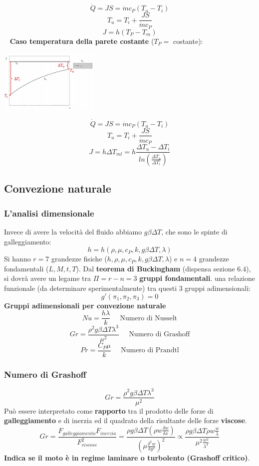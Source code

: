 \[
    \dot{Q} = JS = \dot{m} c_P (T_u- T_i)
\]
\[
    T_u = T_i + \frac{JS}{\dot{m} c_P}
\]
\[
    J = h (T_P - T_m)
\]
\ \newline
\textbf{Caso temperatura della parete costante} ($T_P =$ costante):
\begin{center}
    \includegraphics[height=3cm]{../L11/img4.PNG}
\end{center}
\[
    \dot{Q} = JS = \dot{m} c_P (T_u - T_i)
\]
\[
    T_u = T_i + \frac{JS}{\dot{m}c_P}
\]
\[
    J = h \Delta T_{ml} = h \frac{\Delta T_u - \Delta T_i}{ln \left(\frac{\Delta T_u}{\Delta T_i}\right)}
\]
\subsection{Convezione naturale}
\subsubsection{L'analisi dimensionale}
Invece di avere la velocità del fluido abbiamo $g \beta \Delta T$, che sono le spinte di galleggiamento:
\[
    h = h(\rho, \mu, c_P, k, g \beta \Delta T, \lambda)
\]
Si hanno $r = 7$ grandezze fisiche ($h, \rho, \mu, c_P, k, g \beta \Delta T, \lambda$) e $n = 4$ grandezze fondamentali ($L, M, t, T$).\newline
\newline
Dal \textbf{teorema di Buckingham} (dispensa sezione $6.4$), si dovrà avere un legame tra $\Pi = r-n = 3$ \textbf{gruppi fondamentali}.\newline
\newlineEsiste una relazione funzionale (da determinare sperimentalmente) tra questi $3$ gruppi adimensionali:
\[
    g'(\pi_1, \pi_2, \pi_3) = 0
\]
\textbf{Gruppi adimensionali per convezione naturale}
\[
    Nu = \frac{h \lambda}{k} \;\;\;\;\;\text{Numero di Nusselt}
\]
\[
    Gr = \frac{\rho^2 g \beta \Delta T \lambda^3}{\mu^2} \;\;\;\;\;\text{Numero di Grashoff}
\]
\[
    Pr = \frac{C_P \mu}{k} \;\;\;\;\; \text{Numero di Prandtl}
\]
\subsubsection{Numero di Grashoff}
\[
    Gr = \frac{\rho^2 g \beta \Delta T \lambda^3}{\mu^2}
\]
Può essere interpretato come \textbf{rapporto} tra il prodotto delle forze di \textbf{galleggiamento} e di inerzia ed il quadrato della risultante delle forze \textbf{viscose}.
\[
    Gr = \frac{F_{galleggiamento}F_{inerzia}}{F_{viscose}^2} = \frac{\rho g \beta \Delta T \left(\rho w \frac{\delta w}{\delta x}\right)}{\left(\mu \frac{\delta^2 w}{\delta y^2}\right)^2} \propto \frac{\rho g \beta \Delta T \rho w \frac{w}{\lambda}}{\mu^2 \frac{w^2}{\lambda^4}}
\]
\textbf{Indica se il moto è in regime laminare o turbolento (Grashoff critico)}.
